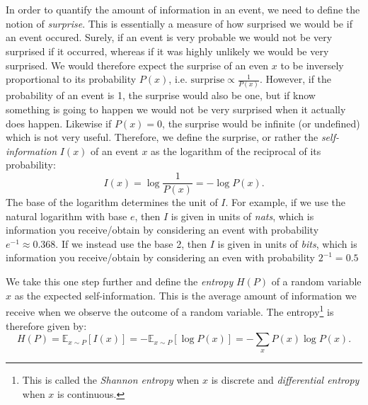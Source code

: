 %
%

\section{}
    \subsection{}
        In order to quantify the amount of information in an event, we need to define the notion of \textit{surprise}. This is essentially a measure of how surprised we would be if an event occured. Surely, if an event is very probable we would not be very surprised if it occurred, whereas if it was highly unlikely we would be very surprised. We would therefore expect the surprise of an even $x$ to be inversely proportional to its probability $P(x)$, i.e. $\mathrm{surprise} \propto \frac{1}{P(x)}$. However, if the probability of an event is 1, the surprise would also be one, but if know something is going to happen we would not be very surprised when it actually does happen. Likewise if  $P(x)=0$, the surprise would be infinite (or undefined) which is not very useful. Therefore, we define the surprise, or rather the \textit{self-information} $I(x)$ of an event $x$ as the logarithm of the reciprocal of its probability:
        \begin{equation}\label{eq:ML:binary_classifier:information_theory:self_information}
            I(x) = \log \frac{1}{P(x)} = -\log P(x).
        \end{equation}
        The base of the logarithm determines the unit of $I$. For example, if we use the natural logarithm with base $e$, then $I$ is given in units of \textit{nats}, which is information you receive/obtain by considering an event with probability $e^{-1} \approx 0.368$. If we instead use the base 2, then $I$ is given in units of \textit{bits}, which is information you receive/obtain by considering an even with probability $2^{-1} = 0.5$

        We take this one step further and define the \textit{entropy} $H(P)$ of a random variable $x$ as the expected self-information. This is the average amount of information we receive when we observe the outcome of a random variable. The entropy\footnote{This is called the \textit{Shannon entropy} when $x$ is discrete and \textit{differential entropy} when $x$ is continuous.} is therefore given by:
        \begin{equation}\label{eq:ML:binary_classifier:information_theory:entropy}
            H(P) = \mathbb{E}_{x \sim P}[I(x)] = -\mathbb{E}_{x \sim P}[\log P(x)] = -\sum_{x} P(x) \log P(x).
        \end{equation}
    
